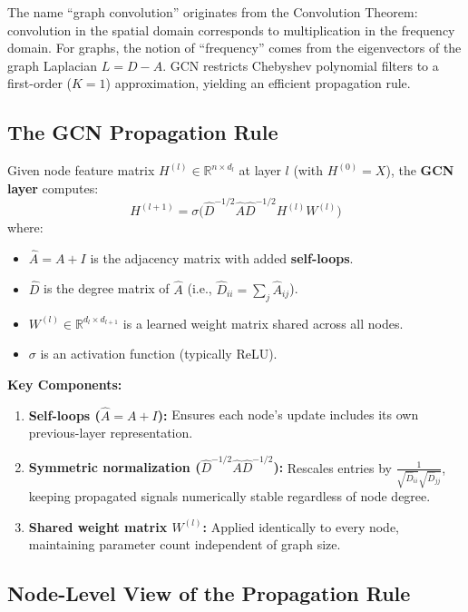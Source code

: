 \documentclass[12pt,a4paper]{article}
\begin{document}
The name ``graph convolution'' originates from the Convolution Theorem: convolution in the spatial domain corresponds to multiplication in the frequency domain. For graphs, the notion of ``frequency'' comes from the eigenvectors of the graph Laplacian $L = D - A$. GCN restricts Chebyshev polynomial filters to a first-order ($K=1$) approximation, yielding an efficient propagation rule.

\subsection{The GCN Propagation Rule}

\begin{definition}
Given node feature matrix $H^{(l)} \in \mathbb{R}^{n \times d_l}$ at layer $l$ (with $H^{(0)} = X$), the \textbf{GCN layer} computes:
\[
H^{(l+1)} = \sigma\Big(\hat{D}^{-1/2} \hat{A} \hat{D}^{-1/2} H^{(l)} W^{(l)}\Big)
\]
where:
\begin{itemize}
    \item $\hat{A} = A + I$ is the adjacency matrix with added \textbf{self-loops}.
    \item $\hat{D}$ is the degree matrix of $\hat{A}$ (i.e., $\hat{D}_{ii} = \sum_j \hat{A}_{ij}$).
    \item $W^{(l)} \in \mathbb{R}^{d_l \times d_{l+1}}$ is a learned weight matrix shared across all nodes.
    \item $\sigma$ is an activation function (typically ReLU).
\end{itemize}
\end{definition}

\textbf{Key Components:}
\begin{enumerate}
    \item \textbf{Self-loops ($\hat{A} = A+I$):} Ensures each node's update includes its own previous-layer representation.
    \item \textbf{Symmetric normalization ($\hat{D}^{-1/2}\hat{A}\hat{D}^{-1/2}$):} Rescales entries by $\frac{1}{\sqrt{\hat{D}_{ii}}\sqrt{\hat{D}_{jj}}}$, keeping propagated signals numerically stable regardless of node degree.
    \item \textbf{Shared weight matrix $W^{(l)}$:} Applied identically to every node, maintaining parameter count independent of graph size.
\end{enumerate}

\subsection{Node-Level View of the Propagation Rule}
\end{document}
